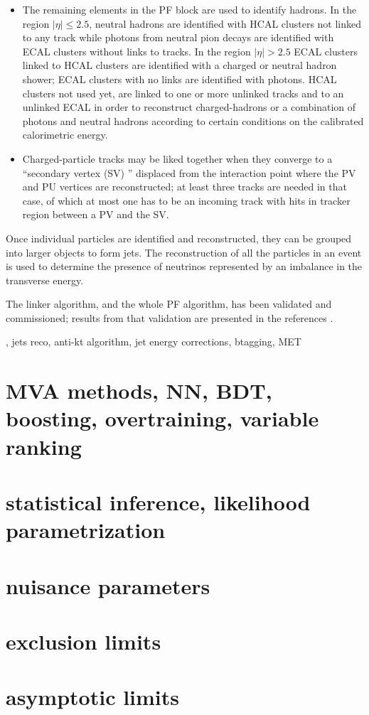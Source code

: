\begin{itemize}
\item The remaining elements in the PF block are used to identify hadrons. In the region $|\eta| \leq 2.5$, neutral hadrons are identified with HCAL clusters not linked to any track while photons from neutral pion decays are identified with ECAL clusters without links to tracks. In the region $|\eta| >2.5$ ECAL clusters linked to HCAL clusters are identified with a charged or neutral hadron shower; ECAL clusters with no links are identified with photons.
  HCAL clusters not used yet, are linked to one or more unlinked tracks and to an unlinked ECAL in order to reconstruct charged-hadrons or a combination of photons and neutral hadrons according to certain conditions on the calibrated calorimetric energy.         

\item Charged-particle tracks may be liked together when they converge to a ``secondary vertex (SV) '' displaced from the interaction point where the PV and PU vertices are reconstructed; at least three tracks are needed in that case, of which at most one has to be an incoming track with hits in tracker region between a PV and the SV.\\
\end{itemize}

\noindent Once individual particles are identified and reconstructed, they can be grouped into larger objects to form jets. The reconstruction of all the particles in an event is used to determine the presence of neutrinos represented by an imbalance in the transverse energy. 

\noindent The linker algorithm, and the whole PF algorithm, has been validated and commissioned; results from that validation are presented in the references \cite{particle_flow}.




, jets reco, anti-kt algorithm, jet energy corrections, btagging, MET 







\section{ MVA methods, NN, BDT, boosting, overtraining, variable ranking  }
\section{statistical inference, likelihood parametrization}
\section{ nuisance parameters}
\section{exclusion limits }
\section{asymptotic limits }












